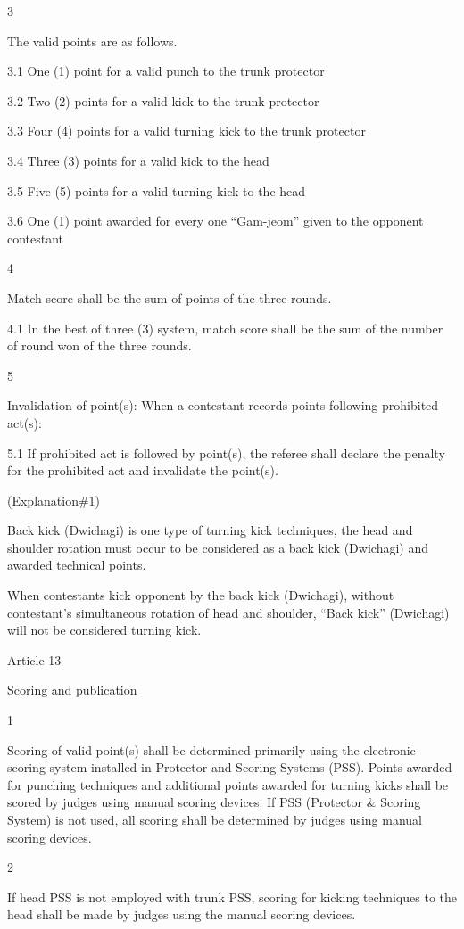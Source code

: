 \documentclass[
]{report}
\begin{document}
3

The valid points are as follows.

3.1 One (1) point for a valid punch to the trunk protector

3.2 Two (2) points for a valid kick to the trunk protector

3.3 Four (4) points for a valid turning kick to the trunk protector

3.4 Three (3) points for a valid kick to the head

3.5 Five (5) points for a valid turning kick to the head

3.6 One (1) point awarded for every one ``Gam-jeom'' given to the
opponent contestant

4

Match score shall be the sum of points of the three rounds.

4.1 In the best of three (3) system, match score shall be the sum of the
number of round won of the three rounds.

5

Invalidation of point(s): When a contestant records points following
prohibited act(s):

5.1 If prohibited act is followed by point(s), the referee shall declare
the penalty for the prohibited act and invalidate the point(s).

(Explanation\#1)

Back kick (Dwichagi) is one type of turning kick techniques, the head
and shoulder rotation must occur to be considered as a back kick
(Dwichagi) and awarded technical points.

When contestants kick opponent by the back kick (Dwichagi), without
contestant's simultaneous rotation of head and shoulder, ``Back kick''
(Dwichagi) will not be considered turning kick.

Article 13

Scoring and publication

1

Scoring of valid point(s) shall be determined primarily using the
electronic scoring system installed in Protector and Scoring Systems
(PSS). Points awarded for punching techniques and additional points
awarded for turning kicks shall be scored by judges using manual scoring
devices. If PSS (Protector \& Scoring System) is not used, all scoring
shall be determined by judges using manual scoring devices.

2

If head PSS is not employed with trunk PSS, scoring for kicking
techniques to the head shall be made by judges using the manual scoring
devices.
\end{document}
